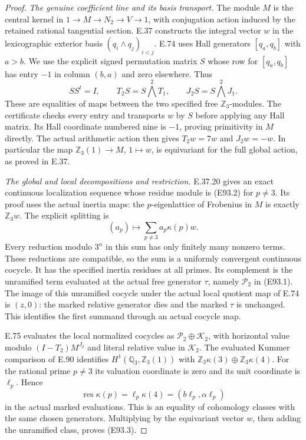 \begin{proof}
\emph{The genuine coefficient line and its basis transport.}
The module $M$ is the central kernel in
$1\to M\to N_2\to V\to1$, with conjugation action induced
by the retained rational tangential section. E.37 constructs
the integral vector $w$ in the lexicographic exterior basis
$(q_i\wedge q_j)_{i<j}$. E.74 uses Hall generators
$[q_a,q_b]$ with $a>b$. We use the explicit signed permutation
matrix $S$ whose row for $[q_a,q_b]$ has entry $-1$ in
column $(b,a)$ and zero elsewhere. Thus
\[
 SS^t=I,\qquad
 T_2S=S\bigwedge^2T_1,\qquad J_2S=S\bigwedge^2J_1.
 \tag{E93.11}
\]
These are equalities of maps between the two specified
free $\mathbb Z_3$-modules. The certificate checks every
entry and transports $w$ by $S$ before applying any Hall
matrix. Its Hall coordinate numbered nine is $-1$, proving
primitivity in $M$ directly. The actual arithmetic action
then gives $T_2w=7w$ and $J_2w=-w$. In particular the map
$\mathbb Z_3(1)\to M$, $1\mapsto w$, is equivariant for
the full global action, as proved in E.37.

\emph{The global and local decompositions and restriction.}
E.37.20 gives an exact continuous localization sequence
whose residue module is (E93.2) for $p\ne3$. Its proof uses
the actual inertia maps: the $p$-eigenlattice of Frobenius
in $M$ is exactly $\mathbb Z_3w$. The explicit splitting is
\[
 (a_p)\longmapsto\sum_{p\ne3}a_p\kappa(p)w.
 \tag{E93.12}
\]
Every reduction modulo $3^n$ in this sum has only finitely
many nonzero terms. These reductions are compatible, so the
sum is a uniformly convergent continuous cocycle. It has
the specified inertia residues at all primes. Its complement
is the unramified term evaluated at the actual free
generator $\tau$, namely $\mathcal P_2$ in (E93.1).
The image of this unramified cocycle under the actual local
quotient map of E.74 is $(z,0)$: the marked relative
generator dies and the marked $\tau$ is unchanged. This
identifies the first summand through an actual cocycle map.

E.75 evaluates the local normalized cocycles as
$\mathcal P_2\oplus\mathcal K_2$, with horizontal value
modulo $(I-T_2)M^{J_2}$ and literal relative value in
$\mathcal K_2$. The evaluated Kummer comparison of E.90
identifies $H^1(\mathbb Q_3,\mathbb Z_3(1))$ with
$\mathbb Z_3\kappa(3)\oplus\mathbb Z_3\kappa(4)$.
For the rational prime $p\ne3$ its valuation coordinate
is zero and its unit coordinate is $\ell_p$. Hence
\[
 \operatorname{res}\kappa(p)
       =\ell_p\kappa(4)
       =(b\ell_p,\alpha\ell_p)
 \tag{E93.13}
\]
in the actual marked evaluations. This is an equality of
cohomology classes with the same chosen generators.
Multiplying by the equivariant vector $w$, then adding the
unramified class, proves (E93.3).


\end{proof}
